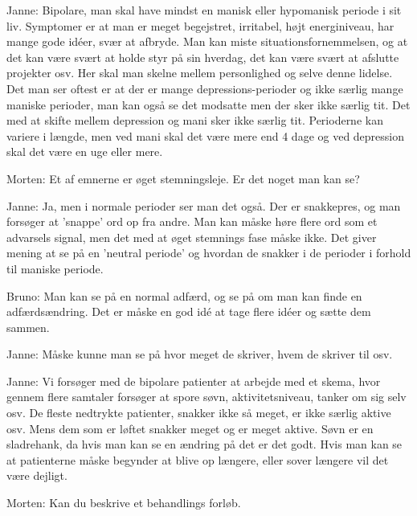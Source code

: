 Janne: Bipolare, man skal have mindst en manisk eller hypomanisk periode i sit liv. Symptomer er at man er meget begejstret, irritabel, højt energiniveau, har mange gode idéer, svær at afbryde. Man kan miste situationsfornemmelsen, og at det kan være svært at holde styr på sin hverdag, det kan være svært at afslutte projekter osv. Her skal man skelne mellem personlighed og selve denne lidelse. Det man ser oftest er at der er mange depressions-perioder og ikke særlig mange maniske perioder, man kan også se det modsatte men der sker ikke særlig tit. Det med at skifte mellem depression og mani sker ikke særlig tit. Perioderne kan variere i længde, men ved mani skal det være mere end 4 dage og ved depression skal det være en uge eller mere. 

Morten: Et af emnerne er øget stemningsleje. Er det noget man kan se?

Janne: Ja, men i normale perioder ser man det også. Der er snakkepres, og man forsøger at 'snappe' ord op fra andre. Man kan måske høre flere ord som et advarsels signal, men det med at øget stemnings fase måske ikke. Det giver mening at se på en 'neutral periode' og hvordan de snakker i de perioder i forhold til maniske periode.

Bruno: Man kan se på en normal adfærd, og se på om man kan finde en adfærdsændring. Det er måske en god idé at tage flere idéer og sætte dem sammen.

Janne: Måske kunne man se på hvor meget de skriver, hvem de skriver til osv. 

Janne: Vi forsøger med de bipolare patienter at arbejde med et skema, hvor gennem flere samtaler forsøger at spore søvn, aktivitetsniveau, tanker om sig selv osv. De fleste nedtrykte patienter, snakker ikke så meget, er ikke særlig aktive osv. Mens dem som er løftet snakker meget og er meget aktive. Søvn er en sladrehank, da hvis man kan se en ændring på det er det godt. Hvis man kan se at patienterne måske begynder at blive op længere, eller sover længere vil det være dejligt.

Morten: Kan du beskrive et behandlings forløb.

